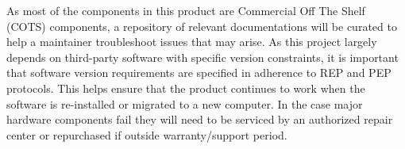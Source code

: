As most of the components in this product are Commercial Off The Shelf (COTS) components, a repository of relevant documentations will be curated to help a maintainer troubleshoot issues that may arise. As this project largely depends on third-party software with specific version constraints, it is important that software version requirements are specified in adherence to REP and PEP protocols. This helps ensure that the product continues to work when the software is re-installed or migrated to a new computer. In the case major hardware components fail they will need to be serviced by an authorized repair center or repurchased if outside warranty/support period. 



